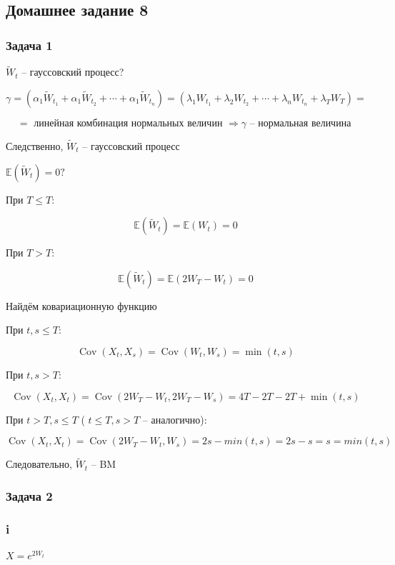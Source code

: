 \documentclass[a4paper,12pt]{article}
\def \mbb{\mathbb}
\def \cov{{\operatorname{Cov}}}
\def \E{\mbb{E}}
\begin{document}
\subsection{Домашнее задание 8}


\subsubsection{Задача 1}

$ \tilde{W}_t $ -- гауссовский процесс?

\[ \gamma = \left( \alpha_1  \tilde{W}_{t_{1}} + \alpha_1 \tilde{W}_{t_{2}} + \cdots + \alpha_1 \tilde{W}_{t_{n}} \right)  = \left(\lambda_1 W_{t_{1}} + \lambda_2 W_{t_{2}} + \cdots + \lambda_n W_{t_{n}} + \lambda_T W_{T}  \right) =   \]

\[ = \text{ линейная комбинация нормальных величин } \Rightarrow  \gamma \text{ -- нормальная величина }\] 

Следственно, $ \tilde{W}_t $ -- гауссовский процесс

$ \E(\tilde{W}_t) = 0? $

При $ T \le T $:

\[ \E(\tilde{W}_t) = \E(W_t) = 0 \]

При $ T > T $:

\[ \E(\tilde{W}_t) = \E(2W_T - W_t) = 0 \]

Найдём ковариационную функцию

При $ t,s  \le T $:

\[ \cov(X_t, X_s) = \cov(W_t, W_s) = \min(t,s) \]

При  $ t,s > T $:

\[ \cov(X_t, X_t) = \cov(2W_T - W_t, 2W_T - W_s) = 4T - 2T - 2T + \min(t,s) \]

При  $ t > T, s \le T $ ( $ t \le T, s > T $ -- аналогично):

\[ \cov(X_t, X_t) = \cov(2W_T - W_t, W_s) =  2s - min(t,s) = 2s-s = s = min(t,s)\]

Следовательно, $ \tilde{W}_t $ -- BM

\subsubsection{Задача 2}

\subsubsection{i}

$ X = e^{2W_t} $
\end{document}
